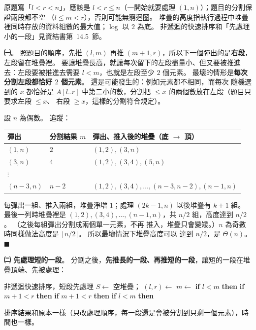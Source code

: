 \begin{pastsoln}
原題寫「$l<r<n$」，應該是 $l < r \le n$（一開始就要處理 $(1, n)$）；題目的分割保證兩段都不空
（$l \le m < r$），否則可能無窮迴圈。 堆疊的高度指執行過程中堆疊裡同時存放的資料組數的最大值；$\log$ 以
$2$ 為底。 非遞迴的快速排序和「先處理小的一段」見資結書第~14.5~節。

\textbf{㈠}。 照題目的順序，先推 $(l, m)$ 再推 $(m+1, r)$，所以下一個彈出的是\textbf{右段}，左段留在堆疊裡。
要讓堆疊長高，就讓每次留下的左段盡量小、但又要被推進去：左段要被推進去需要 $l < m$，也就是左段至少
$2$ 個元素。 最壞的情形是\textbf{每次分割左段都恰好 $2$ 個元素}。 這是可能發生的：例如元素都不相同，而每次
隨機選到的 $x$ 都恰好是 $A[l..r]$ 中第二小的數，分割把 $\le x$ 的兩個數放在左段（題目只要求左段 $\le x$、
右段 $\ge x$，這樣的分割符合規定）。

設 $n$ 為偶數。 追蹤：
\begin{center}
\begin{tabular}{lll}
\toprule
彈出 & 分割結果 $m$ & 彈出、推入後的堆疊（底 $\to$ 頂） \\
\midrule
$(1, n)$ & $2$ & $(1,2), (3,n)$ \\
$(3, n)$ & $4$ & $(1,2), (3,4), (5,n)$ \\
$\vdots$ & & \\
$(n-3, n)$ & $n-2$ & $(1,2), (3,4), \ldots, (n-3,n-2), (n-1,n)$ \\
\bottomrule
\end{tabular}
\end{center}
每彈出一組、推入兩組，堆疊淨增 $1$；處理 $(2k-1, n)$ 以後堆疊有 $k + 1$ 組。 最後一列時堆疊裡是
$(1,2), (3,4), \ldots, (n-1,n)$，共 $n/2$ 組，高度達到 $n/2$。 （之後每組彈出分割成兩個單一元素，不再
推入，堆疊只會變矮。）$n$ 為奇數時同樣做法高度是 $\lfloor n/2 \rfloor$。 所以最壞情況下堆疊高度可以
達到 $n/2$，是 $\Theta(n)$。 \hfill$\blacksquare$

\textbf{㈡ 先處理短的一段}。 分割之後，\textbf{先推長的一段、再推短的一段}，讓短的一段在堆疊頂端、先被處理：
\begin{pseudo}[unbreakable]{非遞迴快速排序，短段先處理}
    \State $S \gets$ 空堆疊；
        \State $(l, r) \gets$ 
        \State $m \gets$ 
         
            \State \textbf{if} $l < m$ \textbf{then} 
            \State \textbf{if} $m + 1 < r$ \textbf{then} 
        \Else {}
            \State \textbf{if} $m + 1 < r$ \textbf{then} 
            \State \textbf{if} $l < m$ \textbf{then} 
        \EndIf
    \EndWhile
\EndProcedure
\end{pseudo}
排序結果和原本一樣（只改處理順序，每一段還是會被分割到只剩一個元素），時間也一樣。


\end{pastsoln}
